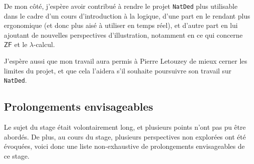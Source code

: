 \documentclass[a4paper]{article}
\newcommand{\ZF}{\mathsf{ZF}}
\begin{document}
De mon côté, j'espère avoir contribué à rendre le projet \verb+NatDed+ plus utilisable dans le cadre d'un cours d'introduction à la logique, d'une part en le rendant plus ergonomique (et donc plus aisé à utiliser en temps réel), et d'autre part en lui ajoutant de nouvelles perspectives d'illustration, notamment en ce qui concerne $\ZF$ et le $\lambda$-calcul.

J'espère aussi que mon travail aura permis à Pierre Letouzey de mieux cerner les limites du projet, et que cela l'aidera s'il souhaite poursuivre son travail sur \verb+NatDed+.

\subsection*{Prolongements envisageables}

Le sujet du stage était volontairement long, et plusieurs points n'ont pas pu être abordés. De plus, au cours du stage, plusieurs perspectives non explorées ont été évoquées, voici donc une liste non-exhaustive de prolongements envisageables de ce stage.
\end{document}
